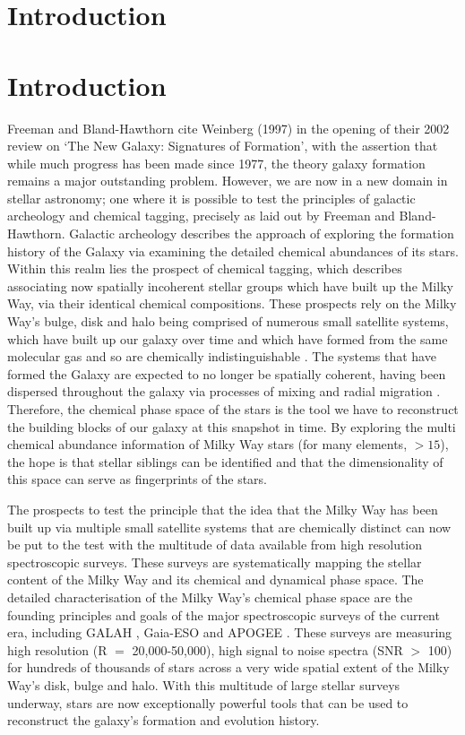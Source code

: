 \documentclass[12pt, letterpaper, preprint]{aastex}
\newcommand{\foreign}[1]{\textsl{#1}}
\newcommand{\eg}{\foreign{e.\,g.}}
\begin{document}
\section{Introduction}

\section{Introduction}\label{sec:Intro}

Freeman and Bland-Hawthorn cite Weinberg (1997) in the opening of
their 2002 review on `The New Galaxy: Signatures of Formation', with
the assertion that while much progress has been made since 1977, the
theory galaxy formation remains a major outstanding problem.
However, we are now in a new domain in stellar astronomy; one where it
is possible to test the principles of galactic archeology and chemical
tagging, precisely as laid out by Freeman and Bland-Hawthorn.
Galactic archeology describes the approach of exploring the formation
history of the Galaxy via examining the detailed chemical abundances
of its stars.
Within this realm lies the prospect of chemical tagging, which
describes associating now spatially incoherent stellar groups which
have built up the Milky Way, via their identical chemical
compositions.
These prospects rely on the Milky Way's bulge, disk and halo being
comprised of numerous small satellite systems, which have built up our
galaxy over time and which have formed from the same molecular gas and
so are chemically indistinguishable \citep[see][and references
  therein]{DaSilva2015}.
The systems that have formed the Galaxy are expected to no longer be
spatially coherent, having been dispersed throughout the galaxy via
processes of mixing and radial migration \citep[\eg,][]{Roskar2009, Quillen2015}.
Therefore, the chemical phase space of the stars is the tool we have
to reconstruct the building blocks of our galaxy at this snapshot in
time.
By exploring the multi chemical abundance information of Milky Way
stars (for many elements, $>15$), the hope is that stellar siblings
can be identified and that the dimensionality of this space can serve
as fingerprints of the stars.

The prospects to test the principle that the idea that the Milky Way
has been built up via multiple small satellite systems that are
chemically distinct can now be put to the test with the multitude of
data available from high resolution spectroscopic surveys.
These surveys are systematically mapping the stellar content of the
Milky Way and its chemical and dynamical phase space.
The detailed characterisation of the Milky Way's chemical phase space
are the founding principles and goals of the major spectroscopic
surveys of the current era, including GALAH \citep{Freeman2013, da
  Silva 2015}, Gaia-ESO \citep{Gilmore 2012} and APOGEE
\citep{Majewsk2015}.
These surveys are measuring high resolution (R $=$ 20,000-50,000),
high signal to noise spectra (SNR $>$ 100) for hundreds of thousands
of stars across a very wide spatial extent of the Milky Way's disk,
bulge and halo.
With this multitude of large stellar surveys underway, stars are now
exceptionally powerful tools that can be used to reconstruct the
galaxy's formation and evolution history.
\end{document}
